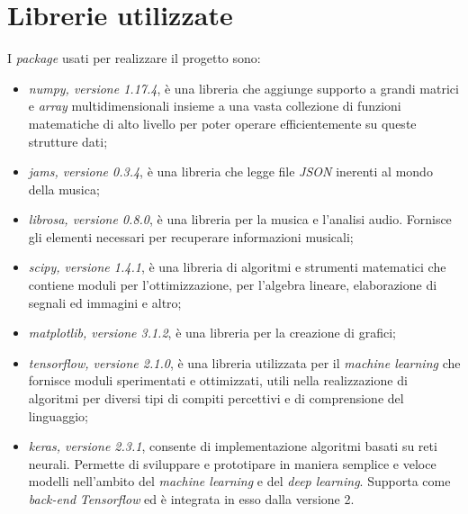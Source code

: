 \section{Librerie utilizzate}
I \textit{package} usati per realizzare il progetto sono:
\begin{itemize}
	\item \textit{numpy, versione 1.17.4}, è una libreria che aggiunge supporto a grandi matrici e \textit{array} multidimensionali insieme a una vasta collezione di funzioni matematiche di alto livello per poter operare efficientemente su queste strutture dati;
	\item \textit{jams, versione 0.3.4}, è una libreria che legge file \textit{JSON} inerenti al mondo della musica;
	\item \textit{librosa, versione 0.8.0}, è una libreria per la musica e l'analisi audio. Fornisce gli elementi necessari per recuperare informazioni musicali;
	\item \textit{scipy, versione 1.4.1}, è una libreria di algoritmi e strumenti matematici che contiene moduli per l'ottimizzazione, per l'algebra lineare, elaborazione di segnali ed immagini e altro;
	\item \textit{matplotlib, versione 3.1.2}, è una libreria per la creazione di grafici;
	\item \textit{tensorflow, versione 2.1.0}, è una libreria utilizzata per il \textit{machine learning} che fornisce moduli sperimentati e ottimizzati, utili nella realizzazione di algoritmi per diversi tipi di compiti percettivi e di comprensione del linguaggio;
	\item \textit{keras, versione 2.3.1}, consente di implementazione algoritmi basati su reti neurali. Permette di sviluppare e prototipare in maniera semplice e veloce modelli nell’ambito del \textit{machine learning} e del \textit{deep learning}. Supporta come \textit{back-end} \textit{Tensorflow} ed è integrata in esso dalla versione 2.
\end{itemize}

